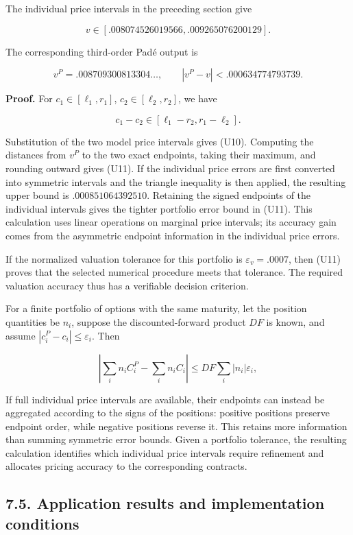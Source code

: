 \documentclass[a4paper,11pt]{article}
\begin{document}
The individual price intervals in the preceding section give

\[
v\in
[.008074526019566,.009265076200129].
\tag{U10}
\]

The corresponding third-order Padé output is

\[
v^P=.008709300813304\ldots,
\qquad
|v^P-v|<.000634774793739.
\tag{U11}
\]

\textbf{Proof.} For $c_1\in[\ell_1,r_1]$, $c_2\in[\ell_2,r_2]$, we have

\[
c_1-c_2\in[\ell_1-r_2,r_1-\ell_2].
\]

Substitution of the two model price intervals gives (U10). Computing the distances from $v^P$ to the two exact endpoints, taking their maximum, and rounding outward gives (U11). If the individual price errors are first converted into symmetric intervals and the triangle inequality is then applied, the resulting upper bound is $.000851064392510$. Retaining the signed endpoints of the individual intervals gives the tighter portfolio error bound in (U11). This calculation uses linear operations on marginal price intervals; its accuracy gain comes from the asymmetric endpoint information in the individual price errors.

If the normalized valuation tolerance for this portfolio is $\varepsilon_v=.0007$, then (U11) proves that the selected numerical procedure meets that tolerance. The required valuation accuracy thus has a verifiable decision criterion.

For a finite portfolio of options with the same maturity, let the position quantities be $n_i$, suppose the discounted-forward product $DF$ is known, and assume $|c_i^P-c_i|\le\varepsilon_i$. Then

\[
\left|\sum_i n_i C_i^P-\sum_i n_i C_i\right|
\le DF\sum_i|n_i|\varepsilon_i,
\tag{U12}
\]

If full individual price intervals are available, their endpoints can instead be aggregated according to the signs of the positions: positive positions preserve endpoint order, while negative positions reverse it. This retains more information than summing symmetric error bounds. Given a portfolio tolerance, the resulting calculation identifies which individual price intervals require refinement and allocates pricing accuracy to the corresponding contracts.

\subsection*{7.5. Application results and implementation conditions}
\end{document}
